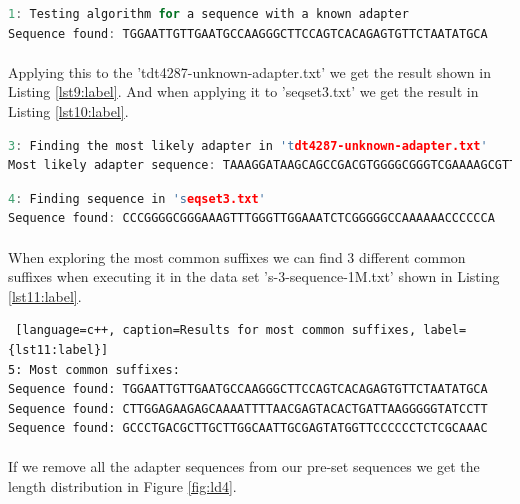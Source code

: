 \documentclass[a4paper,10pt]{article}
\begin{document}
\begin{lstlisting}[language=c++, caption=Results for the most likely adapter sequence algorithm in 's-3-sequence-1M.txt' , label={lst8:label}]
1: Testing algorithm for a sequence with a known adapter
Sequence found: TGGAATTGTTGAATGCCAAGGGCTTCCAGTCACAGAGTGTTCTAATATGCA
\end{lstlisting}

\paragraph{} Applying this to the 'tdt4287-unknown-adapter.txt' we get the result shown in Listing \ref{lst9:label}. And when applying it to 'seqset3.txt' we get the result in Listing \ref{lst10:label}.

\begin{lstlisting}[language=c++, caption=Results for the most likely adapter sequence algorithm in 'tdt4287-unknown-adapter.txt', label={lst9:label}]
3: Finding the most likely adapter in 'tdt4287-unknown-adapter.txt'
Most likely adapter sequence: TAAAGGATAAGCAGCCGACGTGGGGCGGGTCGAAAAGCGTTAGGATTACTGAGTAGATCGGAA-GAGCACACGTCTGAACTCCAGTCACGTAGAGATCTCGTATGCCGTCTTCTGCTTGAAA 
\end{lstlisting}

\begin{lstlisting}[language=c++, caption=Results for the most likely adapter sequence algorithm in 'seqset3.txt', label={lst10:label}]
4: Finding sequence in 'seqset3.txt'
Sequence found: CCCGGGGCGGGAAAGTTTGGGTTGGAAATCTCGGGGGCCAAAAAACCCCCCA 
\end{lstlisting}

\paragraph{} When exploring the most common suffixes we can find 3 different common suffixes when executing it in the data set 's-3-sequence-1M.txt' shown in Listing \ref{lst11:label}.

\begin{lstlisting} [language=c++, caption=Results for most common suffixes, label={lst11:label}]
5: Most common suffixes:
Sequence found: TGGAATTGTTGAATGCCAAGGGCTTCCAGTCACAGAGTGTTCTAATATGCA
Sequence found: CTTGGAGAAGAGCAAAATTTTAACGAGTACACTGATTAAGGGGGTATCCTT
Sequence found: GCCCTGACGCTTGCTTGGCAATTGCGAGTATGGTTCCCCCCTCTCGCAAAC
\end{lstlisting}


\paragraph{} If we remove all the adapter sequences from our pre-set sequences we get the length distribution in Figure \ref{fig:ld4}.
\end{document}
